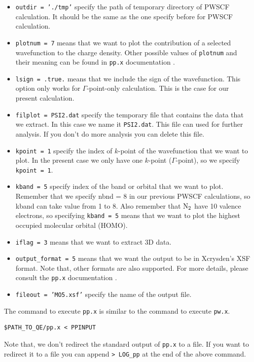 \documentclass[12pt,english]{paper}
\begin{document}
\begin{itemize}
\item \texttt{outdir = './tmp'} specify the path of temporary directory
of PWSCF calculation. It should be the same as the one specify before
for PWSCF calculation.
\item \texttt{plotnum = 7} means that we want to plot the contribution of
a selected wavefunction to the charge density. Other possible values
of \texttt{plotnum} and their meaning can be found in \texttt{pp.x}
documentation \cite{pp-doc}.
\item \texttt{lsign = .true.} means that we include the sign of the wavefunction.
This option only works for $\Gamma$-point-only calculation. This
is the case for our present calculation.
\item \texttt{filplot = PSI2.dat} specify the temporary file that contains
the data that we extract. In this case we name it \texttt{PSI2.dat}.
This file can used for further analysis. If you don't do more analysis
you can delete this file.
\item \texttt{kpoint = 1} specify the index of $k$-point of the wavefunction
that we want to plot. In the present case we only have one $k$-point
($\Gamma$-point), so we specify \texttt{kpoint = 1}.
\item \texttt{kband = 5} specify index of the band or orbital that we want
to plot. Remember that we specify nbnd = 8 in our previous PWSCF calculations,
so kband can take value from 1 to 8. Also remember that $\ce{N2}$
have 10 valence electrons, so specifying \texttt{kband = 5} means
that we want to plot the highest occupied molecular orbital (HOMO).
\item \texttt{iflag = 3} means that we want to extract 3D data.
\item \texttt{output\_format = 5} means that we want the output to be in
Xcrysden's XSF format. Note that, other formats are also supported.
For more details, please consult the \texttt{pp.x} documentation \cite{pp-doc}.
\item \texttt{fileout = 'MO5.xsf'} specify the name of the output file.
\end{itemize}
The command to execute \texttt{pp.x} is similar to the command to
execute \texttt{pw.x}.

\begin{lstlisting}
$PATH_TO_QE/pp.x < PPINPUT
\end{lstlisting}


Note that, we don't redirect the standard output of \texttt{pp.x}
to a file. If you want to redirect it to a file you can append \texttt{>
LOG\_pp} at the end of the above command.
\end{document}
